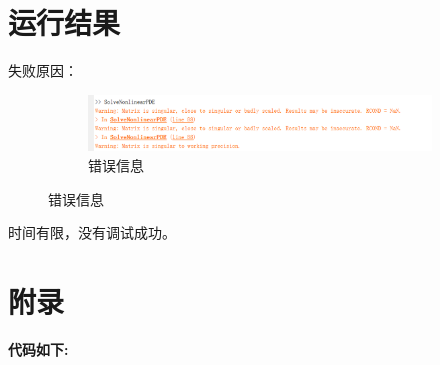 \documentclass[a4paper,left=2.5cm,right=2.5cm]{article}
\begin{document}
	\section{运行结果}
	失败原因：
	\begin{figure}[H]
		\begin{figure}[H]
			\includegraphics[width=\textwidth]{image/error.png}
			\caption{错误信息}
		\end{figure}
	\end{figure}
	时间有限，没有调试成功。
	\newpage
	\section*{附录}
	\begin{appendices}
		\textcolor[rgb]{0.98,0.00,0.00}{\textbf{代码如下:}}
		{\consolas}
	\end{appendices}
\end{document}
